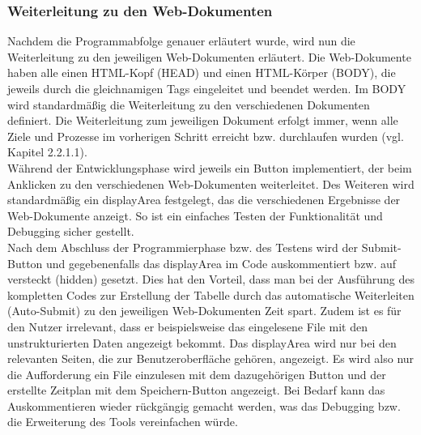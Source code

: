 \subsubsection{Weiterleitung zu den Web-Dokumenten}
Nachdem die Programmabfolge genauer erläutert wurde, wird nun die Weiterleitung zu den jeweiligen Web-Dokumenten erläutert. Die Web-Dokumente haben alle einen HTML-Kopf (HEAD) und einen HTML-Körper (BODY), die jeweils durch die gleichnamigen Tags eingeleitet und beendet werden. Im BODY wird standardmäßig die Weiterleitung zu den verschiedenen Dokumenten definiert. 
Die Weiterleitung zum jeweiligen Dokument erfolgt immer, wenn alle Ziele und Prozesse im vorherigen Schritt erreicht bzw. durchlaufen wurden (vgl. Kapitel 2.2.1.1). \\
Während der Entwicklungsphase wird jeweils ein Button implementiert, der beim Anklicken zu den verschiedenen Web-Dokumenten weiterleitet. Des Weiteren wird standardmäßig ein displayArea festgelegt, das die verschiedenen Ergebnisse der Web-Dokumente anzeigt. So ist ein einfaches Testen der Funktionalität und Debugging sicher gestellt. \\
Nach dem Abschluss der Programmierphase bzw. des Testens wird der Submit-Button und gegebenenfalls das displayArea im Code auskommentiert bzw. auf versteckt (hidden) gesetzt. Dies hat den Vorteil, dass man bei der Ausführung des kompletten Codes zur Erstellung der Tabelle durch das automatische Weiterleiten (Auto-Submit) zu den jeweiligen Web-Dokumenten Zeit spart. Zudem ist es für den Nutzer irrelevant, dass er beispielsweise das eingelesene File mit den unstrukturierten Daten angezeigt bekommt. Das displayArea wird nur bei den relevanten Seiten, die zur Benutzeroberfläche gehören, angezeigt. Es wird also nur die Aufforderung ein File einzulesen mit dem dazugehörigen Button und der erstellte Zeitplan mit dem Speichern-Button angezeigt. 
Bei Bedarf kann das Auskommentieren wieder rückgängig gemacht werden, was das Debugging bzw. die Erweiterung des Tools vereinfachen würde. 


